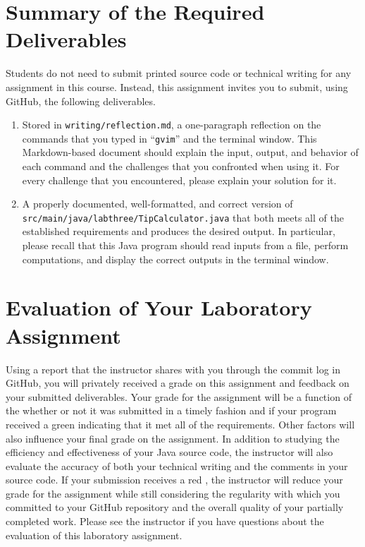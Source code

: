 \documentclass[11pt]{article}
\newcommand{\mainprogramsource}{\lstinline{src/main/java/labthree/TipCalculator.java}}
\newcommand{\reflection}{\lstinline{writing/reflection.md}}
\newcommand{\command}[1]{``\lstinline{#1}''}
\newcommand{\checkmark}{\ding{51}}
\newcommand{\naughtmark}{\ding{55}}
\begin{document}
\section*{Summary of the Required Deliverables}

\noindent Students do not need to submit printed source code or technical writing for any assignment in this course.
Instead, this assignment invites you to submit, using GitHub, the following deliverables.

\begin{enumerate}

  \setlength{\itemsep}{0in}

\item Stored in \reflection{}, a one-paragraph reflection on the commands that you typed in \command{gvim} and the
  terminal window. This Markdown-based document should explain the input, output, and behavior of each command and the
  challenges that you confronted when using it. For every challenge that you encountered, please explain your solution
  for it.

\item A properly documented, well-formatted, and correct version of \mainprogramsource{} that both meets all of the
  established requirements and produces the desired output. In particular, please recall that this Java program should
  read inputs from a file, perform computations, and display the correct outputs in the terminal window.

\end{enumerate}

\section*{Evaluation of Your Laboratory Assignment}

Using a report that the instructor shares with you through the commit log in GitHub, you will privately received a grade
on this assignment and feedback on your submitted deliverables. Your grade for the assignment will be a function of the
whether or not it was submitted in a timely fashion and if your program received a green \checkmark{} indicating that it
met all of the requirements. Other factors will also influence your final grade on the assignment. In addition to
studying the efficiency and effectiveness of your Java source code, the instructor will also evaluate the accuracy of
both your technical writing and the comments in your source code. If your submission receives a red \naughtmark{}, the
instructor will reduce your grade for the assignment while still considering the regularity with which you committed to
your GitHub repository and the overall quality of your partially completed work. Please see the instructor if you have
questions about the evaluation of this laboratory assignment.
\end{document}

